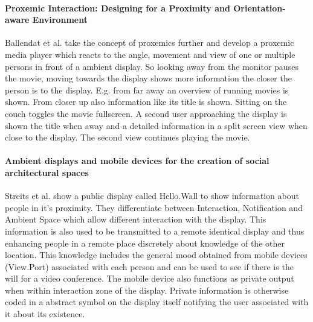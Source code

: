 \paragraph{Proxemic Interaction: Designing for a Proximity and Orientation-aware Environment}
Ballendat et al. \cite{ballendat_proxemic_2010} take the concept of proxemics further and develop a proxemic media player which reacts to the angle, movement and view of one or multiple persons in front of a ambient display.
So looking away from the monitor pauses the movie, moving towards the display shows more information the closer the person is to the display.
E.g. from far away an overview of running movies is shown.
From closer up also information like its title is shown.
Sitting on the couch toggles the movie fullscreen.
A second user approaching the display is shown the title when away and a detailed information in a split screen view when close to the display.
The second view continues playing the movie.

\paragraph{Ambient displays and mobile devices for the creation of social architectural spaces}
Streits et al. \cite{streitz_ambient_2003} show a public display called Hello.Wall to show information about people in it's proximity.
They differentiate between Interaction, Notification and Ambient Space which allow different interaction with the display.
This information is also used to be transmitted to a remote identical display and thus enhancing people in a remote place discretely about knowledge of the other location.
This knowledge includes the general mood obtained from mobile devices (View.Port) associated with each person and can be used to see if there is the will for a video conference.
The mobile device also functions as private output when within interaction zone of the display.
Private information is otherwise coded in a abstract symbol on the display itself notifying the user associated with it about its existence.





